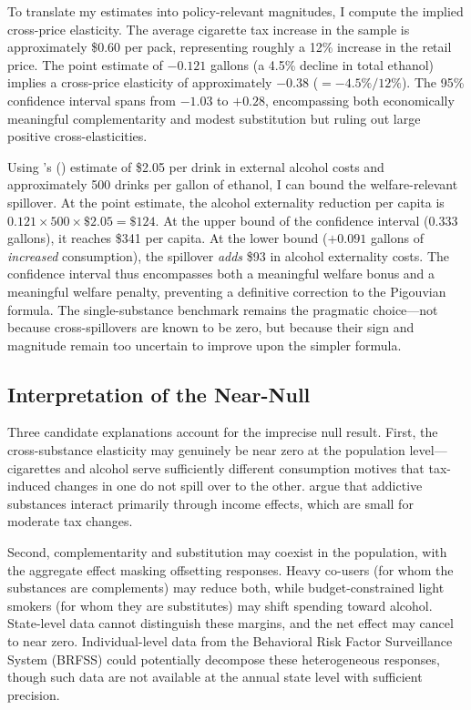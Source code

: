 \documentclass[12pt]{article}
\begin{document}
To translate my estimates into policy-relevant magnitudes, I compute the implied cross-price elasticity. The average cigarette tax increase in the sample is approximately \$0.60 per pack, representing roughly a 12\% increase in the retail price. The point estimate of $-0.121$ gallons (a 4.5\% decline in total ethanol) implies a cross-price elasticity of approximately $-0.38$ ($= -4.5\% / 12\%$). The 95\% confidence interval spans from $-1.03$ to $+0.28$, encompassing both economically meaningful complementarity and modest substitution but ruling out large positive cross-elasticities.

Using \citeauthor{bouchery2011economic}'s (\citeyear{bouchery2011economic}) estimate of \$2.05 per drink in external alcohol costs and approximately 500 drinks per gallon of ethanol, I can bound the welfare-relevant spillover. At the point estimate, the alcohol externality reduction per capita is $0.121 \times 500 \times \$2.05 = \$124$. At the upper bound of the confidence interval (0.333 gallons), it reaches \$341 per capita. At the lower bound ($+0.091$ gallons of \textit{increased} consumption), the spillover \textit{adds} \$93 in alcohol externality costs. The confidence interval thus encompasses both a meaningful welfare bonus and a meaningful welfare penalty, preventing a definitive correction to the Pigouvian formula. The single-substance benchmark remains the pragmatic choice---not because cross-spillovers are known to be zero, but because their sign and magnitude remain too uncertain to improve upon the simpler formula.

\subsection{Interpretation of the Near-Null}

Three candidate explanations account for the imprecise null result. First, the cross-substance elasticity may genuinely be near zero at the population level---cigarettes and alcohol serve sufficiently different consumption motives that tax-induced changes in one do not spill over to the other. \citet{diamond2009identification} argue that addictive substances interact primarily through income effects, which are small for moderate tax changes.

Second, complementarity and substitution may coexist in the population, with the aggregate effect masking offsetting responses. Heavy co-users (for whom the substances are complements) may reduce both, while budget-constrained light smokers (for whom they are substitutes) may shift spending toward alcohol. State-level data cannot distinguish these margins, and the net effect may cancel to near zero. Individual-level data from the Behavioral Risk Factor Surveillance System (BRFSS) could potentially decompose these heterogeneous responses, though such data are not available at the annual state level with sufficient precision.
\end{document}
